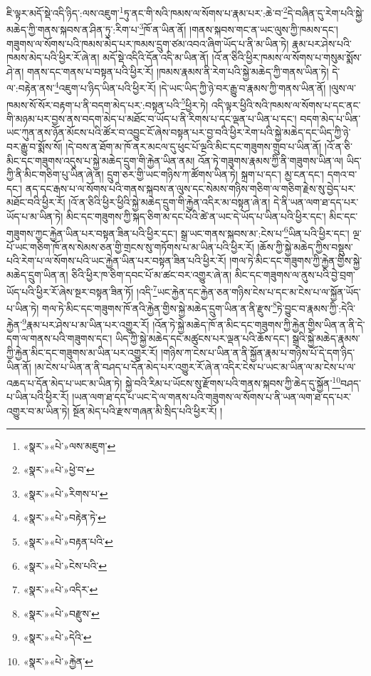 ཇི་ལྟར་མདོ་སྡེ་འདི་ཉིད་:ལས་འཇུག་\footnote{«སྣར་»«པེ་»ལས་མཇུག་}ཏུ་ནང་གི་སའི་ཁམས་ལ་སོགས་པ་རྣམ་པར་:ཆེ་བ་\footnote{«སྣར་»«པེ་»ཕྱེ་བ་}དེ་བཞིན་དུ་རེག་པའི་སྐྱེ་མཆེད་ཀྱི་གནས་སྐབས་ན་ཤིན་ཏུ་:རིག་པ་\footnote{«སྣར་»«པེ་»རིགས་པ་}ཁོ་ན་ཡིན་ནོ། །གནས་སྐབས་གང་ན་ཡང་ལུས་ཀྱི་ཁམས་དང་། གཟུགས་ལ་སོགས་པའི་ཁམས་མེད་པར་ཁམས་དྲུག་ཙམ་འབའ་ཞིག་ཡོད་པ་ནི་མ་ཡིན་ཏེ། རྣམ་པར་ཤེས་པའི་ཁམས་མེད་པའི་ཕྱིར་རོ་ཞེ་ན། མདོ་སྡེ་འདིའི་དོན་འདི་མ་ཡིན་ནོ། །འོ་ན་ཅིའི་ཕྱིར་ཁམས་ལ་སོགས་པ་གསུམ་སྨོས་ཤེ་ན། གནས་དང་གནས་པ་བསྟན་པའི་ཕྱིར་རོ། །ཁམས་རྣམས་ནི་རེག་པའི་སྐྱེ་མཆེད་ཀྱི་གནས་ཡིན་ཏེ། དེ་ལ་:བརྟེན་ནས་\footnote{«སྣར་»«པེ་»བརྟེན་ཏེ་}འཇུག་པ་ཉིད་ཡིན་པའི་ཕྱིར་རོ། །དེ་ཡང་ཡིད་ཀྱི་ཉེ་བར་རྒྱུ་བ་རྣམས་ཀྱི་གནས་ཡིན་ནོ། །ལུས་ལ་ཁམས་སོ་སོར་བརྟག་པ་ནི་བདག་མེད་པར་:བསྟན་པའི་\footnote{«སྣར་»«པེ་»བརྟན་པའི་}ཕྱིར་ཏེ། འདི་ལྟར་ཕྱིའི་སའི་ཁམས་ལ་སོགས་པ་དང་ནང་གི་མཉམ་པར་བྱས་ནས་བདག་མེད་པ་མཐོང་བ་ཡོད་པ་ནི་རིགས་པ་དང་ལྡན་པ་ཡིན་པ་དང་། བདག་མེད་པ་ཡིན་ཡང་ཀུན་ནས་ཉོན་མོངས་པའི་ཚོར་བ་འབྱུང་ངོ་ཞེས་བསྟན་པར་བྱ་བའི་ཕྱིར་རེག་པའི་སྐྱེ་མཆེད་དང་ཡིད་ཀྱི་ཉེ་བར་རྒྱུ་བ་སྨོས་སོ། །དེ་བས་ན་ཐོག་མ་ཁོ་ནར་མངལ་དུ་ཕུང་པོ་ལྔའི་མིང་དང་གཟུགས་གྲུབ་པ་ཡིན་ནོ། །འོ་ན་ཅི་མིང་དང་གཟུགས་འདུས་པ་སྐྱེ་མཆེད་དྲུག་གི་རྐྱེན་ཡིན་ནམ། འོན་ཏེ་གཟུགས་རྣམས་ཀྱི་ནི་གཟུགས་ཡིན་ལ། ཡིད་ཀྱི་ནི་མིང་གཅིག་པུ་ཡིན་ཞེ་ན། དྲུག་ཅར་གྱི་ཡང་གཉིས་ཀ་ཚོགས་ཡིན་ཏེ། སྐྲག་པ་དང་། མྱ་ངན་དང་། དགའ་བ་དང་། ནད་དང་རྒས་པ་ལ་སོགས་པའི་གནས་སྐབས་ན་ལུས་དང་སེམས་གཉིས་གཅིག་ལ་གཅིག་རྗེས་སུ་བྱེད་པར་མཐོང་བའི་ཕྱིར་རོ། །འོ་ན་ཅིའི་ཕྱིར་ཕྱིའི་སྐྱེ་མཆེད་དྲུག་གི་རྐྱེན་འདིར་མ་བསྟན་ཞེ་ན། དེ་ནི་ཡན་ལག་ཐ་དད་པར་ཡོད་པ་མ་ཡིན་ཏེ། མིང་དང་གཟུགས་ཀྱི་སྐད་ཅིག་མ་དང་པོའི་ཚེ་ན་ཡང་དེ་ཡོད་པ་ཡིན་པའི་ཕྱིར་དང་། མིང་དང་གཟུགས་ཀྱང་རྐྱེན་ཡིན་པར་བསྟན་ཟིན་པའི་ཕྱིར་དང་། སྒྲ་ཡང་གནས་སྐབས་མ་:ངེས་པ་\footnote{«སྣར་»«པེ་»ངེས་པའི་}ཡིན་པའི་ཕྱིར་དང་། ལྔ་པོ་ཡང་གཅིག་ཁོ་ནས་སེམས་ཅན་གྱི་གྲངས་སུ་གཏོགས་པ་མ་ཡིན་པའི་ཕྱིར་རོ། །ཆོས་ཀྱི་སྐྱེ་མཆེད་ཀྱིས་བསྡུས་པའི་རེག་པ་ལ་སོགས་པའི་ཡང་རྐྱེན་ཡིན་པར་བསྟན་ཟིན་པའི་ཕྱིར་རོ། །གལ་ཏེ་མིང་དང་གཟུགས་ཀྱི་རྐྱེན་གྱིས་སྐྱེ་མཆེད་དྲུག་ཡིན་ན། ཅིའི་ཕྱིར་ཁ་ཅིག་དབང་པོ་མ་ཚང་བར་འགྱུར་ཞེ་ན། མིང་དང་གཟུགས་ལ་ནུས་པའི་བྱེ་བྲག་ཡོད་པའི་ཕྱིར་རོ་ཞེས་སྔར་བསྟན་ཟིན་ཏོ། །འདི་\footnote{«སྣར་»«པེ་»འདིར་}ཡང་རྐྱེན་དང་རྐྱེན་ཅན་གཉིས་ངེས་པ་དང་མ་ངེས་པ་ལ་སྐྱོན་ཡོད་པ་ཡིན་ཏེ། གལ་ཏེ་མིང་དང་གཟུགས་ཁོ་ནའི་རྐྱེན་གྱིས་སྐྱེ་མཆེད་དྲུག་ཡིན་ན་ནི་རྫུས་\footnote{«སྣར་»«པེ་»བརྫུས་}ཏེ་བྱུང་བ་རྣམས་ཀྱི་:དེའི་རྐྱེན་\footnote{«སྣར་»«པེ་»དེའི་}རྣམ་པར་ཤེས་པ་མ་ཡིན་པར་འགྱུར་རོ། །འོན་ཏེ་སྐྱེ་མཆེད་ཁོ་ན་མིང་དང་གཟུགས་ཀྱི་རྐྱེན་གྱིས་ཡིན་ན་ནི་དེ་དག་ལ་གནས་པའི་གཟུགས་དང་། ཡིད་ཀྱི་སྐྱེ་མཆེད་དང་མཚུངས་པར་ལྡན་པའི་ཆོས་དང་། སྒྲའི་སྐྱེ་མཆེད་རྣམས་ཀྱི་རྐྱེན་མིང་དང་གཟུགས་མ་ཡིན་པར་འགྱུར་རོ། །གཉིས་ཀ་ངེས་པ་ཡིན་ན་ནི་སྐྱོན་རྣམ་པ་གཉིས་པོ་དེ་དག་ཉིད་ཡིན་ནོ། །མ་ངེས་པ་ཡིན་ན་ནི་བཤད་པ་དོན་མེད་པར་འགྱུར་རོ་ཞེ་ན་འདིར་ངེས་པ་ཡང་མ་ཡིན་ལ་མ་ངེས་པ་ལ་འཆད་པ་དོན་མེད་པ་ཡང་མ་ཡིན་ཏེ། སྐྱེ་བའི་རིམ་པ་ཡོངས་སུ་རྫོགས་པའི་གནས་སྐབས་ཀྱི་ཆེད་དུ་སྐྱོན་\footnote{«སྣར་»«པེ་»རྐྱེན་}བཤད་པ་ཡིན་པའི་ཕྱིར་རོ། །ཡན་ལག་ཐ་དད་པ་ཡང་དེ་ལ་གནས་པའི་གཟུགས་ལ་སོགས་པ་ནི་ཡན་ལག་ཐ་དད་པར་འགྱུར་བ་མ་ཡིན་ཏེ། སྔོན་མེད་པའི་རྫས་གཞན་མི་སྲིད་པའི་ཕྱིར་རོ། །
